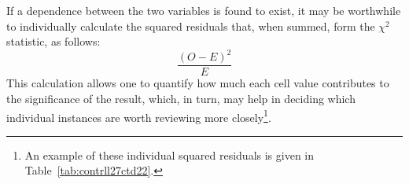 If a dependence between the two variables is found to exist, it may be worthwhile to individually calculate the squared residuals that, when summed, form the \(\chi^2\) statistic, as follows:
\[\frac{(O-E)^2}{E}\]
This calculation allows one to quantify how much each cell value contributes to the significance of the result, which, in turn, may help in deciding which individual instances are worth reviewing more closely\footnote{An example of these individual squared residuals is given in Table~\ref{tab:contrll27ctd22}.}.




